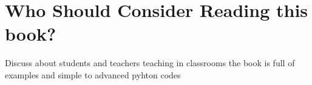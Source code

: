 \section{Who Should Consider Reading this book?}
Discuss about students and 
teachers teaching in classrooms
the book is full of examples and simple to advanced pyhton codes
